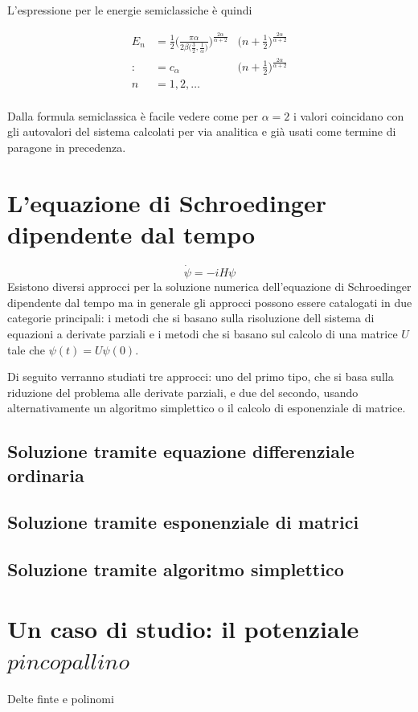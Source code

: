 \documentclass[a4paper,twocolumn,11pt,twoside]{article}
\begin{document}
L'espressione per le energie semiclassiche è quindi

\begin{align*}
    E_n & =
    \frac{1}{2}\Bigg(\frac{\pi\alpha}{2\beta\big(\frac{3}{2},\frac{1}{\alpha}\big)}\Bigg)^\frac{2\alpha}{\alpha+2} &\Bigg(n+\frac{1}{2}\Bigg)^\frac{2\alpha}{\alpha+2} \\
    :&= c_{\alpha} &\Bigg(n+\frac{1}{2}\Bigg)^\frac{2\alpha}{\alpha+2} \\
    n&=1,2,\dots\\
\end{align*}

Dalla formula semiclassica è facile vedere come per \(\alpha=2\) i valori coincidano con gli autovalori del sistema calcolati per via analitica e già usati come termine di paragone in precedenza.

\section{L'equazione di Schroedinger dipendente dal tempo}
\begin{equation}
    \dot{\psi}=-iH\psi
\end{equation}
Esistono diversi approcci per la soluzione numerica dell'equazione di Schroedinger dipendente dal tempo ma in generale gli approcci possono essere catalogati in due categorie principali: i metodi che si basano sulla risoluzione dell sistema di equazioni a derivate parziali e i metodi che si basano sul calcolo di una matrice \(U\) tale che \(\psi(t)=U\psi(0)\).

Di seguito verranno studiati tre approcci: uno del primo tipo, che si basa sulla riduzione del problema alle derivate parziali, e due del secondo, usando alternativamente un algoritmo simplettico o il calcolo di esponenziale di matrice.

\subsection{Soluzione tramite equazione differenziale ordinaria}

\subsection{Soluzione tramite esponenziale di matrici}

\subsection{Soluzione tramite algoritmo simplettico}

\section{Un caso di studio: il potenziale \(pinco pallino\)}
Delte finte e polinomi
\end{document}
